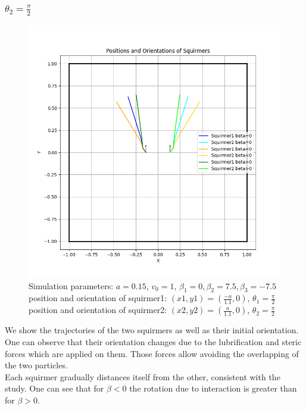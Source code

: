 \documentclass{article}
\begin{document}
\newpage
\subsubsection{$\theta_2 = \frac{\pi}{2}$}
\begin{figure}[h]
   \centering
   \includegraphics[width=1\textwidth]{graphs/simulations/twosquirmerinter/sq2.pi.2.png}
   \caption{\footnotesize Simulation parameters: $a=0.15$, $v_0=1$, $\beta_1=0, \beta_2=7.5, \beta_3=-7.5$\\
   position and orientation of squirmer1: $(x1,y1)=(\frac{-a}{1.1},0)$, $\theta_1=\frac{\pi}{2}$\\
   position and orientation of squirmer2: $(x2,y2)=(\frac{a}{1.1},0)$, $\theta_2=\frac{\pi}{2}$}
\end{figure}
We show the trajectories of the two squirmers as well as their initial orientation.
One can observe that their orientation changes due to the lubrification and steric forces which are applied on them. 
Those forces allow avoiding the overlapping of the two particles.\\
Each squirmer gradually distances itself from the other,
 consistent with the study\cite{Stark}.
 One can see that for $\beta < 0$ the rotation due to interaction is greater
 than for $\beta > 0$.

\newpage
\end{document}
